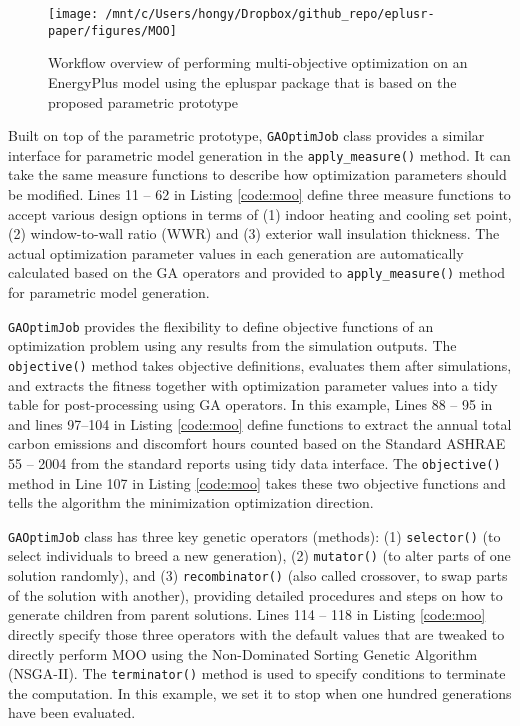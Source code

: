 \documentclass[3p, times]{elsarticle} %
\begin{document}
\begin{figure}[!htb]
\texttt{[image: /mnt/c/Users/hongy/Dropbox/github\_repo/eplusr-paper/figures/MOO]} \caption{Workflow overview of performing multi-objective optimization on an EnergyPlus model using the epluspar package that is based on the proposed parametric prototype}\label{fig:flow-ga}
\end{figure}

Built on top of the parametric prototype, \texttt{GAOptimJob} class provides a similar
interface for parametric model generation in the \texttt{apply\_measure()} method.
It can take the same measure functions to describe how optimization parameters
should be modified.
Lines 11 -- 62 in Listing \ref{code:moo} define three measure functions to
accept various design options in terms of (1) indoor heating and cooling set
point, (2) window-to-wall ratio (WWR) and (3) exterior wall insulation
thickness.
The actual optimization parameter values in each generation are automatically
calculated based on the GA operators and provided to \texttt{apply\_measure()} method
for parametric model generation.

\texttt{GAOptimJob} provides the flexibility to define objective functions of an
optimization problem using any results from the simulation outputs. The
\texttt{objective()} method takes objective definitions, evaluates them after
simulations, and extracts the fitness together with optimization parameter values
into a tidy table for post-processing using GA operators.
In this example, Lines 88 -- 95 in and lines 97--104 in Listing \ref{code:moo}
define functions to extract the annual total carbon emissions and discomfort
hours counted based on the Standard ASHRAE 55 -- 2004 from the standard reports
using tidy data interface.
The \texttt{objective()} method in Line 107 in Listing \ref{code:moo} takes these two
objective functions and tells the algorithm the minimization optimization
direction.

\texttt{GAOptimJob} class has three key genetic operators (methods): (1) \texttt{selector()}
(to select individuals to breed a new generation), (2) \texttt{mutator()} (to alter
parts of one solution randomly), and (3) \texttt{recombinator()} (also called
crossover, to swap parts of the solution with another), providing detailed
procedures and steps on how to generate children from parent solutions.
Lines 114 -- 118 in Listing \ref{code:moo} directly specify those three
operators with the default values that are tweaked to directly perform MOO
using the Non-Dominated Sorting Genetic Algorithm (NSGA-II).
The \texttt{terminator()} method is used to specify conditions to terminate the
computation.
In this example, we set it to stop when one hundred generations have been
evaluated.
\end{document}
